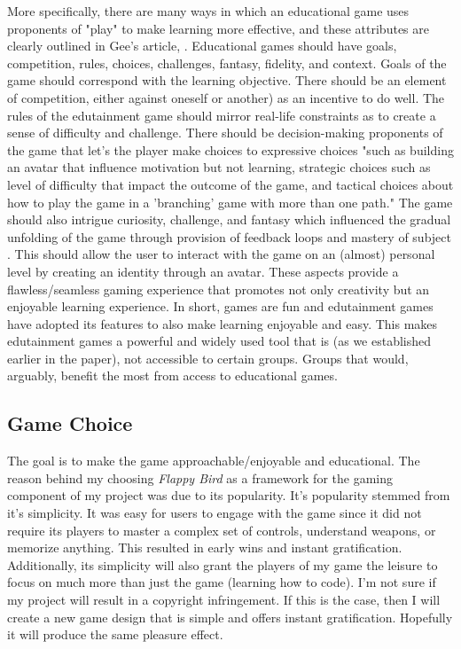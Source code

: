 \documentclass[10pt,twocolumn]{article}
\begin{document}
More specifically, there are many ways in which an educational game uses proponents of "play" to make learning more effective, and these attributes are clearly outlined in Gee's article, . Educational games should have goals, competition, rules, choices, challenges, fantasy, fidelity, and context. 
Goals of the game should correspond with the learning objective. There should be an element of competition, either against oneself or another) as an incentive to do well. The rules of the edutainment game should mirror real-life constraints as to create a sense of difficulty and challenge. There should be decision-making proponents of the game that let's the player make choices to expressive choices "such as building an avatar that influence motivation but not learning, strategic choices such as level of difficulty that impact the outcome of the game, and tactical choices about how to play the game in a 'branching' game with more than one path." \cite{gee2009deep} The game should also intrigue curiosity, challenge, and fantasy \cite{malone1981makes} which influenced the gradual unfolding of the game through provision of feedback loops and mastery of subject \cite{qin2009measuring}. This should allow the user to interact with the game on an (almost) personal level by creating an identity through an avatar. \cite{blascovich2011infinite} These aspects provide a flawless/seamless gaming experience that promotes not only creativity but an enjoyable learning experience. In short, games are fun and edutainment games have adopted its features to also make learning enjoyable and easy. This makes edutainment games a powerful and widely used tool that is (as we established earlier in the paper), not accessible to certain groups. Groups that would, arguably, benefit the most from access to educational games.


\subsection{Game Choice}
The goal is to make the game approachable/enjoyable and educational. The reason behind my choosing \textit{Flappy Bird} \cite{Nguyen} as a framework for the gaming component of my project was due to its popularity. It's popularity stemmed from it's simplicity. It was easy for users to engage with the game since it did not require its players to master a complex set of controls, understand weapons, or memorize anything. This resulted in early wins and instant gratification. Additionally, its simplicity will also grant the players of my game the leisure to focus on much more than just the game (learning how to code).
I'm not sure if my project will result in a copyright infringement. If this is the case, then I will create a new game design that is simple and offers instant gratification. Hopefully it will produce the same pleasure effect.
\end{document}
